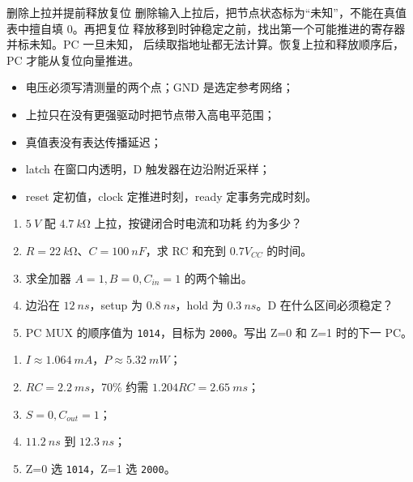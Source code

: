 \begin{faultinjectionbox}{删除上拉并提前释放复位}
删除输入上拉后，把节点状态标为“未知”，不能在真值表中擅自填 0。再把复位
释放移到时钟稳定之前，找出第一个可能推进的寄存器并标未知。PC 一旦未知，
后续取指地址都无法计算。恢复上拉和释放顺序后，PC 才能从复位向量推进。
\end{faultinjectionbox}

\begin{pitfallbox}
\begin{itemize}[leftmargin=2.2em]
  \item 电压必须写清测量的两个点；GND 是选定参考网络；
  \item 上拉只在没有更强驱动时把节点带入高电平范围；
  \item 真值表没有表达传播延迟；
  \item latch 在窗口内透明，D 触发器在边沿附近采样；
  \item reset 定初值，clock 定推进时刻，ready 定事务完成时刻。
\end{itemize}
\end{pitfallbox}


\begin{enumerate}[leftmargin=2.2em]
  \item \(\SI{5}{V}\) 配 \(\SI{4.7}{k\ohm}\) 上拉，按键闭合时电流和功耗
    约为多少？
  \item \(R=\SI{22}{k\ohm}\)、\(C=\SI{100}{nF}\)，求 RC 和充到
    \(0.7V_{CC}\) 的时间。
  \item 求全加器 \(A=1,B=0,C_{in}=1\) 的两个输出。
  \item 边沿在 \(\SI{12}{ns}\)，setup 为 \(\SI{0.8}{ns}\)，hold 为
    \(\SI{0.3}{ns}\)。D 在什么区间必须稳定？
  \item PC MUX 的顺序值为 \texttt{1014}，目标为 \texttt{2000}。写出
    Z=0 和 Z=1 时的下一 PC。
\end{enumerate}

\begin{answerbox}
\begin{enumerate}[leftmargin=2.2em]
  \item \(I\approx\SI{1.064}{mA}\)，\(P\approx\SI{5.32}{mW}\)；
  \item \(RC=\SI{2.2}{ms}\)，70\% 约需 \(1.204RC=\SI{2.65}{ms}\)；
  \item \(S=0,C_{out}=1\)；
  \item \(\SI{11.2}{ns}\) 到 \(\SI{12.3}{ns}\)；
  \item Z=0 选 \texttt{1014}，Z=1 选 \texttt{2000}。
\end{enumerate}
\end{answerbox}

